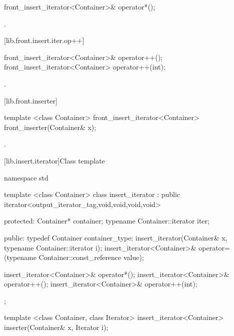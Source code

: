 %
\begin{itemdecl}
front_insert_iterator<Container>& operator*();
\end{itemdecl}

\begin{itemdescr}
\pnum
\returns
{}.
\end{itemdescr}

[lib.front.insert.iter.op++]{}

%
\begin{itemdecl}
front_insert_iterator<Container>& operator++();
front_insert_iterator<Container>  operator++(int);
\end{itemdecl}

\begin{itemdescr}
\pnum
\returns
{}.
\end{itemdescr}

[lib.front.inserter]{}

%
\begin{itemdecl}
template <class Container>
  front_insert_iterator<Container> front_inserter(Container& x);
\end{itemdecl}

\begin{itemdescr}
\pnum
\returns
{}.
\end{itemdescr}

[lib.insert.iterator]{Class template }

%
\begin{codeblock}
namespace std {
  template <class Container>
  class insert_iterator :
        public iterator<output_iterator_tag,void,void,void,void> {
  protected:
    Container* container;
    typename Container::iterator iter;

  public:
    typedef Container container_type;
    insert_iterator(Container& x, typename Container::iterator i);
    insert_iterator<Container>&
      operator=(typename Container::const_reference value);

    insert_iterator<Container>& operator*();
    insert_iterator<Container>& operator++();
    insert_iterator<Container>& operator++(int);
  };

  template <class Container, class Iterator>
    insert_iterator<Container> inserter(Container& x, Iterator i);
}
\end{codeblock}

